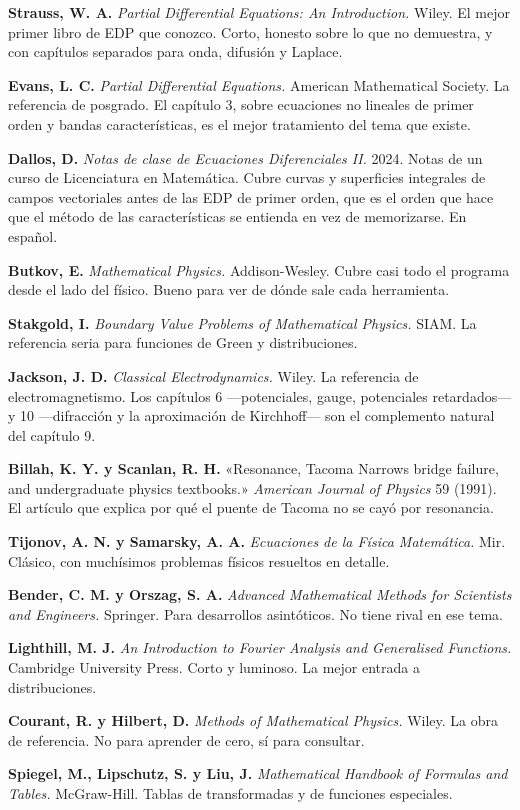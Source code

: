 \documentclass[
  spanish,
  a4paper,
]{scrbook}
\theoremstyle{definition}
\theoremstyle{plain}
\theoremstyle{definition}
\theoremstyle{plain}
\theoremstyle{definition}
\theoremstyle{remark}
\begin{document}
\textbf{Strauss, W. A.} \emph{Partial Differential Equations: An
Introduction.} Wiley. El mejor primer libro de EDP que conozco. Corto,
honesto sobre lo que no demuestra, y con capítulos separados para onda,
difusión y Laplace.

\textbf{Evans, L. C.} \emph{Partial Differential Equations.} American
Mathematical Society. La referencia de posgrado. El capítulo 3, sobre
ecuaciones no lineales de primer orden y bandas características, es el
mejor tratamiento del tema que existe.

\textbf{Dallos, D.} \emph{Notas de clase de Ecuaciones Diferenciales
II.} 2024. Notas de un curso de Licenciatura en Matemática. Cubre curvas
y superficies integrales de campos vectoriales antes de las EDP de
primer orden, que es el orden que hace que el método de las
características se entienda en vez de memorizarse. En español.

\textbf{Butkov, E.} \emph{Mathematical Physics.} Addison-Wesley. Cubre
casi todo el programa desde el lado del físico. Bueno para ver de dónde
sale cada herramienta.

\textbf{Stakgold, I.} \emph{Boundary Value Problems of Mathematical
Physics.} SIAM. La referencia seria para funciones de Green y
distribuciones.

\textbf{Jackson, J. D.} \emph{Classical Electrodynamics.} Wiley. La
referencia de electromagnetismo. Los capítulos 6 ---potenciales, gauge,
potenciales retardados--- y 10 ---difracción y la aproximación de
Kirchhoff--- son el complemento natural del capítulo 9.

\textbf{Billah, K. Y. y Scanlan, R. H.} «Resonance, Tacoma Narrows
bridge failure, and undergraduate physics textbooks.» \emph{American
Journal of Physics} 59 (1991). El artículo que explica por qué el puente
de Tacoma no se cayó por resonancia.

\textbf{Tijonov, A. N. y Samarsky, A. A.} \emph{Ecuaciones de la Física
Matemática.} Mir. Clásico, con muchísimos problemas físicos resueltos en
detalle.

\textbf{Bender, C. M. y Orszag, S. A.} \emph{Advanced Mathematical
Methods for Scientists and Engineers.} Springer. Para desarrollos
asintóticos. No tiene rival en ese tema.

\textbf{Lighthill, M. J.} \emph{An Introduction to Fourier Analysis and
Generalised Functions.} Cambridge University Press. Corto y luminoso. La
mejor entrada a distribuciones.

\textbf{Courant, R. y Hilbert, D.} \emph{Methods of Mathematical
Physics.} Wiley. La obra de referencia. No para aprender de cero, sí
para consultar.

\textbf{Spiegel, M., Lipschutz, S. y Liu, J.} \emph{Mathematical
Handbook of Formulas and Tables.} McGraw-Hill. Tablas de transformadas y
de funciones especiales.


\backmatter
\end{document}
